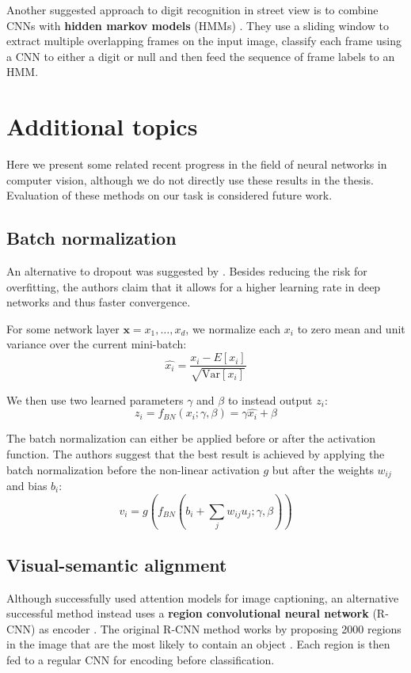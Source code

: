 Another suggested approach to digit recognition in street view is to combine CNNs with \textbf{hidden markov models} (HMMs) \cite{multidigit_streetview_CNN_HMM}. They use a sliding window to extract multiple overlapping frames on the input image, classify each frame using a CNN to either a digit or null and then feed the sequence of frame labels to an HMM.


\section{Additional topics}
Here we present some related recent progress in the field of neural networks in computer vision, although we do not directly use these results in the thesis.
Evaluation of these methods on our task is considered future work.

\subsection{Batch normalization}

An alternative to dropout was suggested by \textcite{BatchNormalization}. Besides reducing the risk for overfitting, the authors claim that it allows for a higher learning rate in deep networks and thus faster convergence.

For some network layer $\mathbf{x} = {x_1, \ldots, x_d}$, we normalize each $x_i$ to zero mean and unit variance over the current mini-batch:
\[
\hat{x_i} = \frac{x_i - E[x_i]}{ \sqrt{\text{Var} [x_i]} }
\]

We then use two learned parameters $\gamma$ and $\beta$ to instead output $z_i$:
\[
z_i = f_{BN}(x_i; \gamma, \beta) = \gamma \hat{x_i} + \beta
\]

The batch normalization can either be applied before or after the activation function. The authors suggest that the best result is achieved by applying the batch normalization before the non-linear activation $g$ but after the weights $w_{ij}$ and bias $b_i$:
\[
v_i = g\left( f_{BN}\left( b_i + \sum_j w_{ij} u_j; \gamma, \beta \right) \right)
\]

\subsection{Visual-semantic alignment}


Although \textcite{AttendAndTell} successfully used attention models for image captioning,
an alternative successful method instead uses a \textbf{region convolutional neural network} (R-CNN) as encoder \cite{VisualSemanticAlignment}.
The original R-CNN method works by proposing 2000 regions in the image that are the most likely to contain an object \cite{RCNN}. Each region is then fed to a regular CNN for encoding before classification.

